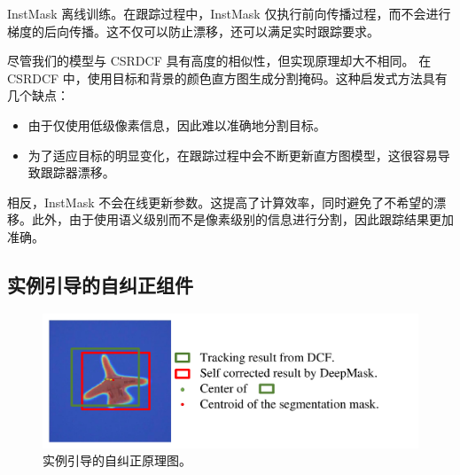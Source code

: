 InstMask 离线训练。在跟踪过程中，InstMask 仅执行前向传播过程，而不会进行梯度的后向传播。这不仅可以防止漂移，还可以满足实时跟踪要求。

尽管我们的模型与 CSRDCF \cite{Lukezic2017DiscriminativeCF}具有高度的相似性，但实现原理却大不相同。
在CSRDCF \cite{Lukezic2017DiscriminativeCF}中，使用目标和背景的颜色直方图生成分割掩码。这种启发式方法具有几个缺点：

\begin{itemize}
\item 由于仅使用低级像素信息，因此难以准确地分割目标。
\item 为了适应目标的明显变化，在跟踪过程中会不断更新直方图模型，这很容易导致跟踪器漂移。
\end{itemize}

相反，InstMask 不会在线更新参数。这提高了计算效率，同时避免了不希望的漂移。此外，由于使用语义级别而不是像素级别的信息进行分割，因此跟踪结果更加准确。

\subsection{实例引导的自纠正组件} \label{sec:cog}

\begin{figure}[t]
    \centering
    \includegraphics[width=1.0\textwidth]{Img/IGCF/cog_arch.pdf}
    \caption{实例引导的自纠正原理图。}
    \label{fig:net}
\end{figure}

